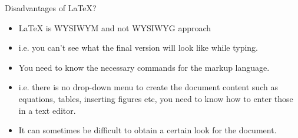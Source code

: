 \documentclass[style=lehigh,orient=landscape]{powerdot}
\begin{document}
\begin{wideslide}[bm={Disadvantages of \LaTeX{}?}]{Disadvantages of \LaTeX{}?}
  \begin{itemize}
  \item \LaTeX{} is WYSIWYM and not WYSIWYG approach
  \item[] i.e. you can't see what the final version will look like while typing.
  \item You need to know the necessary commands for the markup language.
  \item[] i.e. there is no drop-down menu to create the document content such as equations, tables, inserting figures etc, you need to know how to enter those in a text editor.
  \item It can sometimes be difficult to obtain a certain look for the document.
  \end{itemize}
\end{wideslide}
\end{document}
